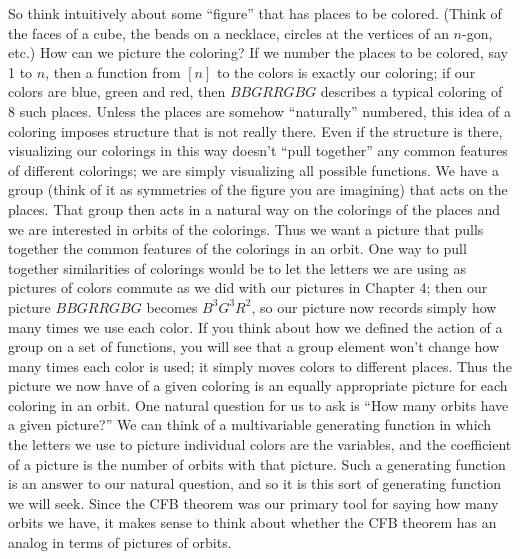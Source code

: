 \documentclass[10pt,]{book}
\theoremstyle{plain}
\theoremstyle{definition}
\numberwithin{equation}{chapter}
\begin{document}
So think intuitively about some ``figure'' that has places to be colored. (Think of the faces of a cube, the beads on a necklace, circles at the vertices of an \(n\)-gon, etc.) How can we picture the coloring? If we number the places to be colored, say 1 to \(n\), then a function from \([n]\) to the colors is exactly our coloring; if our colors are blue, green and red, then \(BBGRRGBG\) describes a typical coloring of 8 such places. Unless the places are somehow ``naturally'' numbered, this idea of a coloring imposes structure that is not really there. Even if the structure is there, visualizing our colorings in this way doesn't ``pull together'' any common features of different colorings; we are simply visualizing all possible functions. We have a group (think of it as symmetries of the figure you are imagining) that acts on the places. That group then acts in a natural way on the colorings of the places and we are interested in orbits of the colorings. Thus we want a picture that pulls together the common features of the colorings in an orbit. One way to pull together similarities of colorings would be to let the letters we are using as pictures of colors commute as we did with our pictures in Chapter 4; then our picture \(BBGRRGBG\) becomes \(B^3G^3R^2\), so our picture now records simply how many times we use each color. If you think about how we defined the action of a group on a set of functions, you will see that a group element won't change how many times each color is used; it simply moves colors to different places. Thus the picture we now have of a given coloring is an equally appropriate picture for each coloring in an orbit. One natural question for us to ask is ``How many orbits have a given picture?'' We can think of a multivariable generating function in which the letters we use to picture individual colors are the variables, and the coefficient of a picture is the number of orbits with that picture. Such a generating function is an answer to our natural question, and so it is this sort of generating function we will seek. Since the CFB theorem was our primary tool for saying how many orbits we have, it makes sense to think about whether the CFB theorem has an analog in terms of pictures of orbits.%
\typeout{************************************************}
\typeout{************************************************}
\end{document}
